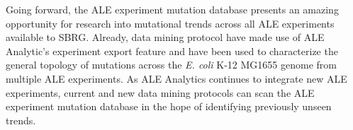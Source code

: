 \documentclass[12pt,final,masters,chapterheads]{ucsd}  %
\begin{document}
Going forward, the ALE experiment mutation database presents an amazing opportunity for research into mutational trends across all ALE experiments available to SBRG. Already, data mining protocol have made use of ALE Analytic's experiment export feature and have been used to characterize the general topology of mutations across the \textit{E. coli} K-12 MG1655 genome from multiple ALE experiments. As ALE Analytics continues to integrate new ALE experiments, current and new data mining protocols can scan the ALE experiment mutation database in the hope of identifying previously unseen trends.

\appendix

\end{document}

